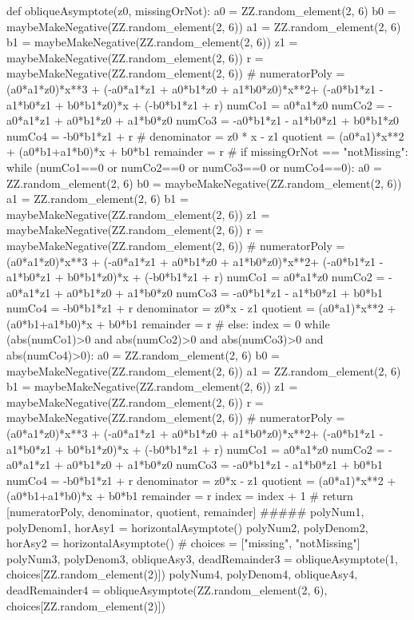 \documentclass{ximera}
\begin{document}
\begin{sagesilent}
def obliqueAsymptote(z0, missingOrNot):
    a0 = ZZ.random_element(2, 6)
    b0 = maybeMakeNegative(ZZ.random_element(2, 6))
    a1 = ZZ.random_element(2, 6)
    b1 = maybeMakeNegative(ZZ.random_element(2, 6))
    z1 = maybeMakeNegative(ZZ.random_element(2, 6))
    r = maybeMakeNegative(ZZ.random_element(2, 6))
    #
    numeratorPoly = (a0*a1*z0)*x**3 + (-a0*a1*z1 + a0*b1*z0 + a1*b0*z0)*x**2+ (-a0*b1*z1 - a1*b0*z1 + b0*b1*z0)*x + (-b0*b1*z1 + r)
    numCo1 = a0*a1*z0
    numCo2 = -a0*a1*z1 + a0*b1*z0 + a1*b0*z0
    numCo3 = -a0*b1*z1 - a1*b0*z1 + b0*b1*z0
    numCo4 = -b0*b1*z1 + r
    #
    denominator = z0 * x - z1
    quotient = (a0*a1)*x**2 + (a0*b1+a1*b0)*x + b0*b1
    remainder = r
    #
    if missingOrNot == "notMissing":
        while (numCo1==0 or numCo2==0 or numCo3==0 or numCo4==0):
            a0 = ZZ.random_element(2, 6)
            b0 = maybeMakeNegative(ZZ.random_element(2, 6))
            a1 = ZZ.random_element(2, 6)
            b1 = maybeMakeNegative(ZZ.random_element(2, 6))
            z1 = maybeMakeNegative(ZZ.random_element(2, 6))
            r = maybeMakeNegative(ZZ.random_element(2, 6))
            #
            numeratorPoly = (a0*a1*z0)*x**3 + (-a0*a1*z1 + a0*b1*z0 + a1*b0*z0)*x**2+ (-a0*b1*z1 - a1*b0*z1 + b0*b1*z0)*x + (-b0*b1*z1 + r)
            numCo1 = a0*a1*z0
            numCo2 = -a0*a1*z1 + a0*b1*z0 + a1*b0*z0
            numCo3 = -a0*b1*z1 - a1*b0*z1 + b0*b1
            numCo4 = -b0*b1*z1 + r
            denominator = z0*x - z1
            quotient = (a0*a1)*x**2 + (a0*b1+a1*b0)*x + b0*b1
            remainder = r
            #
    else:
        index =  0
        while (abs(numCo1)>0 and abs(numCo2)>0 and abs(numCo3)>0 and abs(numCo4)>0):
            a0 = ZZ.random_element(2, 6)
            b0 = maybeMakeNegative(ZZ.random_element(2, 6))
            a1 = ZZ.random_element(2, 6)
            b1 = maybeMakeNegative(ZZ.random_element(2, 6))
            z1 = maybeMakeNegative(ZZ.random_element(2, 6))
            r = maybeMakeNegative(ZZ.random_element(2, 6))
            #
            numeratorPoly = (a0*a1*z0)*x**3 + (-a0*a1*z1 + a0*b1*z0 + a1*b0*z0)*x**2+ (-a0*b1*z1 - a1*b0*z1 + b0*b1*z0)*x + (-b0*b1*z1 + r)
            numCo1 = a0*a1*z0
            numCo2 = -a0*a1*z1 + a0*b1*z0 + a1*b0*z0
            numCo3 = -a0*b1*z1 - a1*b0*z1 + b0*b1
            numCo4 = -b0*b1*z1 + r
            denominator = z0*x - z1
            quotient = (a0*a1)*x**2 + (a0*b1+a1*b0)*x + b0*b1
            remainder = r
            index =  index + 1
            #
    return [numeratorPoly, denominator, quotient, remainder]
#####
polyNum1, polyDenom1, horAsy1 = horizontalAsymptote()
polyNum2, polyDenom2, horAsy2 = horizontalAsymptote()
#
choices = ["missing", "notMissing"]
polyNum3, polyDenom3, obliqueAsy3, deadRemainder3 = obliqueAsymptote(1, choices[ZZ.random_element(2)])
polyNum4, polyDenom4, obliqueAsy4, deadRemainder4 = obliqueAsymptote(ZZ.random_element(2, 6), choices[ZZ.random_element(2)])
\end{sagesilent}
 
\end{document}

